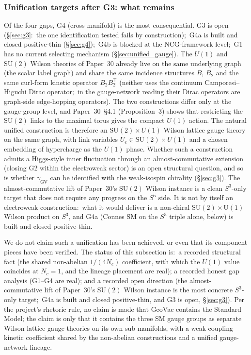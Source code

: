 \documentclass[11pt]{article}
\begin{document}
\subsubsection*{Unification targets after G3: what remains}

Of the four gaps, G4 (cross-manifold) is the most consequential.  G3
is open (\S\ref{sec:g3}:\ the one identification tested fails by
construction);\ G4a is
built and closed positive-thin (\S\ref{sec:g4});\ G4b is blocked at
the NCG-framework level;\ G1 has no current selecting mechanism
(\S\ref{sec:unified_gauge}).  The
$U(1)$ and $\mathrm{SU}(2)$ Wilson theories of Paper~30 already live on
the same underlying graph (the scalar label graph) and
share the same incidence structures $B$, $B_2$ and the same curl-form
kinetic operator $B_2B_2^{\top}$ (neither uses the continuum
Camporesi--Higuchi Dirac operator;\ in the gauge-network reading their
Dirac operators are graph-side edge-hopping operators).  The two
constructions differ only at the gauge-group level,
and Paper~30~\S 4.1 (Proposition~3) shows that restricting the
$\mathrm{SU}(2)$ links to the maximal torus gives the compact $U(1)$
action.  The natural
unified construction is therefore an $\mathrm{SU}(2) \times U(1)$
Wilson lattice gauge theory on the same graph, with link variables
$U_e \in \mathrm{SU}(2) \times U(1)$ and a chosen embedding of
hypercharge as the $U(1)$ phase.  Whether such a construction
admits a Higgs-style inner fluctuation through an
almost-commutative extension (closing G2 within the electroweak
sector) is an open structural question, and so is whether
$\gamma_{\mathrm{GV}}$ can be identified with the weak-isospin chirality
(\S\ref{sec:g3}).
The almost-commutative lift of Paper~30's
$\mathrm{SU}(2)$ Wilson instance is a clean $S^3$-only target that does not require any
progress on the $S^5$ side. It is not by itself an electroweak
construction:\ what it would deliver is a non-chiral
$\mathrm{SU}(2) \times \mathrm{U}(1)$ Wilson product on $S^3$, and G4a (Connes SM on the $S^3$ triple alone, below)
is built and closed positive-thin.

We do not claim such a unification has been achieved, or even that
its component pieces have been verified.  The status of this
subsection is:\ a recorded structural fact (the shared non-abelian
$1/(4N_c)$ coefficient, with which the $U(1)$ value coincides at $N_c = 1$,
and the lineage placement are real); a recorded
honest gap analysis (G1--G4 are real); and a recorded open
direction (the almost-commutative lift of Paper~30's $\mathrm{SU}(2)$
Wilson instance is the most concrete $S^3$-only target;\ G4a is built
and closed positive-thin, and G3 is open, \S\ref{sec:g3}).  Per the project's rhetoric rule, no claim is made that GeoVac
contains the Standard Model; the claim is only that it contains
the three SM gauge groups as separate Wilson lattice gauge
theories on its own sub-manifolds, with a weak-coupling kinetic
coefficient shared by the non-abelian constructions and a unified
gauge-network lineage.
\end{document}
